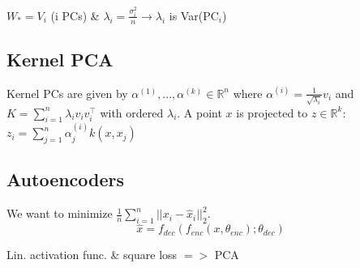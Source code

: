 $W_*=V_i$  (i PCs) \& $\lambda_i = \frac{\sigma_i^2}{n} \rightarrow \lambda_i$ is Var(PC$_i$)

\subsection*{Kernel PCA}

Kernel PCs are given by $\alpha^{(1)},...,\alpha^{(k)}\in \mathbb{R}^n$ 
where $\alpha^{(i)} = \frac{1}{\sqrt{\lambda_i}}v_i$ and 
$K = \sum_{i=1}^n \lambda_i v_i v_i^\top$ with ordered $\lambda_i.$ A point 
$x$ is projected to $z \in \mathbb{R}^k$:
$z_i = \sum_{j=1}^n\alpha_j^{(i)}k(x,x_j)$

\subsection*{Autoencoders}

We want to minimize $\frac{1}{n}\sum_{i=1}^n ||x_i - \hat{x}_i||_2^2$.
$$\hat{x} = f_{dec}(f_{enc}(x, \theta_{enc}); \theta_{dec})$$

Lin. activation func. \& square loss $=>$ PCA